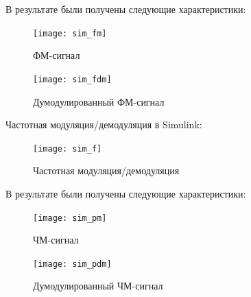 \documentclass[10pt,a4paper]{article}
\begin{document}
В результате были получены следующие характеристики:
\begin{figure}[h]\centering
    \texttt{[image: sim\_fm]} 
    \caption{ФМ-сигнал}\label{fig.sim_fm}
\end{figure}

\begin{figure}[h]\centering
    \texttt{[image: sim\_fdm]} 
    \caption{Думодулированный ФМ-сигнал}\label{fig.sim_fdm}
\end{figure}
\FloatBarrier

Частотная модуляция/демодуляция в Simulink:
\begin{figure}[h]\centering
    \texttt{[image: sim\_f]} 
    \caption{Частотная модуляция/демодуляция}\label{fig.sim_f}
\end{figure}                                                                                                                                                                                                                                                                                                                                                                                                                                                                                                                                                                                                                                                                                                                                                                                                                                                                                                                                                                                                                                                                                                                                                                                                                                                                                                                                                                                                                                                                       

В результате были получены следующие характеристики:
\begin{figure}[h]\centering
    \texttt{[image: sim\_pm]} 
    \caption{ЧМ-сигнал}\label{fig.sim_pm}
\end{figure}

\begin{figure}[h]\centering
    \texttt{[image: sim\_pdm]} 
    \caption{Думодулированный ЧМ-сигнал}\label{fig.sim_pdm}
\end{figure}
\FloatBarrier
\end{document}

